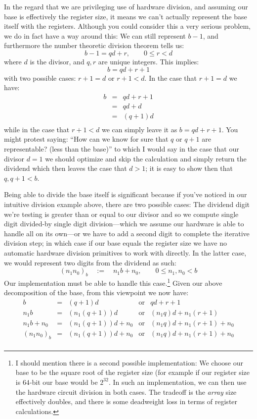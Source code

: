 \documentclass[twoside]{article}
\begin{document}
In the regard that we are privileging use of hardware division, and assuming our base is effectively the register size,
it means we can't actually represent the base itself with the registers. Although you could consider this a very serious
problem, we do in fact have a way around this: We can still represent $ b-1 $, and furthermore the number theoretic division
theorem tells us:
$$ b-1=qd+r,\qquad 0\le r < d $$
where $ d $ is the divisor, and $ q,r $ are unique integers. This implies:
$$ b=qd+r+1 $$
with two possible cases: $ r+1=d $ or $ r+1 < d $. In the case that $ r+1=d $ we have:
$$ \begin{array}{rcl}
b	& = &	qd+r+1	\\
	& = &	qd+d	\\
	& = &	(q+1)d	\\
\end{array} $$
while in the case that $ r+1 < d $ we can simply leave it as $ b=qd+r+1 $. You might protest saying: ``How can we know
for sure that $ q $ or $ q+1 $ are representable? (less than the base)'' to which I would say in the case that
our divisor $ d=1 $ we should optimize and skip the calculation and simply return the dividend which then leaves
the case that $ d > 1 $; it is easy to show then that $ q,q+1 < b $.

Being able to divide the base itself is significant because if you've noticed in our intuitive division example above,
there are two possible cases: The dividend digit we're testing is greater than or equal to our divisor and so we compute
single digit divided-by single digit division---which we assume our hardware is able to handle all on its own---or we have
to add a second digit to complete the iterative division step; in which case if our base equals the register size we have
no automatic hardware division primitives to work with directly. In the latter case, we would represent two digits from
the dividend as such:
$$ (n_1n_0)_b\quad:=\quad n_1b+n_0,\qquad 0\le n_1,n_0 < b $$
Our implementation must be able to handle this case.\footnote{I should mention there is a second possible implementation:
We choose our base to be the square root of the register size (for example if our register size is $ 64 $-bit our
base would be $ 2^{32} $. In such an implementation, we can then use the hardware circuit division in both cases.
The tradeoff is the \emph{array} size effectively doubles, and there is some deadweight loss in terms of register
calculations.} Given our above decomposition of the base, from this viewpoint we now have:
$$ \begin{array}{rclcl}
b		& = &	(q+1)d		& \mbox{or} &	qd+r+1			\\
n_1b		& = &	(n_1(q+1))d	& \mbox{or} &	(n_1q)d+n_1(r+1)	\\
n_1b+n_0	& = &	(n_1(q+1))d+n_0	& \mbox{or} &	(n_1q)d+n_1(r+1)+n_0	\\
(n_1n_0)_b	& = &	(n_1(q+1))d+n_0	& \mbox{or} &	(n_1q)d+n_1(r+1)+n_0	\\
\end{array} $$
\end{document}

